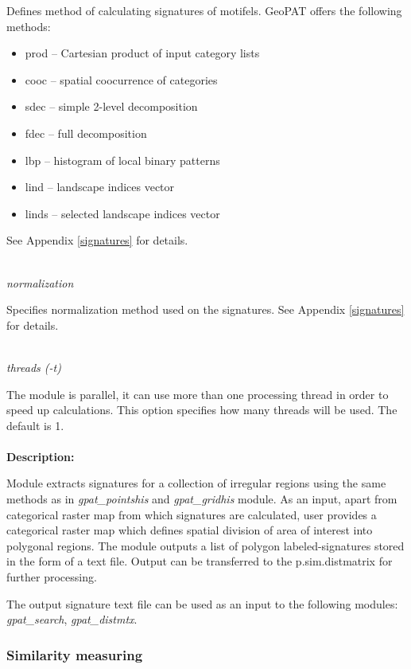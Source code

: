 \documentclass[12pt,margin=0.5in]{article}
\newcommand{\newoption}[1]{\mbox{}\\{\it #1}}
\begin{document}
Defines method of calculating signatures of motifels. GeoPAT offers the following methods: 
\begin{itemize}
	\item prod -- Cartesian product of input category lists
	\item cooc -- spatial coocurrence of categories
	\item sdec -- simple 2-level decomposition
	\item fdec -- full decomposition
	\item lbp -- histogram of local binary patterns
	\item lind -- landscape indices vector
	\item linds -- selected landscape indices vector
\end{itemize}
See Appendix \ref{signatures} for details.

\newoption{normalization}

Specifies normalization method used on the signatures. See Appendix \ref{signatures} for details.

\newoption{threads (-t)}

The module is parallel, it can use more than one processing thread in order to speed up calculations. This option specifies how many threads will be used. The default is 1.
\\\\
{\bf Description:}

Module extracts signatures for a collection of irregular regions using the same methods as in {\it gpat\_pointshis} and {\it gpat\_gridhis} module. As an input, apart from categorical raster map from which signatures are calculated, user provides a categorical raster map which defines spatial division of area of interest into polygonal regions. The module outputs a list of polygon labeled-signatures stored in the form of a text file. Output can be transferred to the p.sim.distmatrix for further processing.

The output signature text file can be used as an input to the following modules: {\it gpat\_search}, {\it gpat\_distmtx}.


\subsubsection{Similarity measuring}
\end{document}
